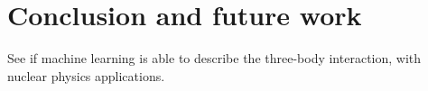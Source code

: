 \chapter{Conclusion and future work} \label{sec:conclusion}
See if machine learning is able to describe the three-body interaction, with nuclear physics applications. 